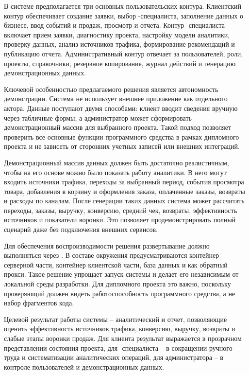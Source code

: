 В системе предполагается три основных пользовательских контура. Клиентский контур обеспечивает создание заявки, выбор -специалиста, заполнение данных о бизнесе, ввод событий и продаж, просмотр  и отчета. Контур -специалиста включает прием заявки, диагностику проекта, настройку модели аналитики, проверку данных, анализ источников трафика, формирование рекомендаций и публикацию отчета. Административный контур отвечает за пользователей, роли, проекты, справочники, резервное копирование, журнал действий и генерацию демонстрационных данных.

Ключевой особенностью предлагаемого решения является автономность демонстрации. Система не использует внешнее  приложение как отдельного актора. Данные поступают двумя способами: клиент вводит сведения вручную через табличные формы, а администратор может сформировать демонстрационный массив для выбранного проекта. Такой подход позволяет проверить все основные функции программного средства в рамках дипломного проекта и не зависеть от сторонних учетных записей или внешних интеграций.

Демонстрационный массив данных должен быть достаточно реалистичным, чтобы на его основе можно было показать работу аналитики. В него могут входить источники трафика, переходы за выбранный период, события просмотра товара, добавления в корзину и оформления заказа, оплаченные заказы, возвраты и расходы по каналам. После генерации таких данных система может рассчитать переходы, заказы, выручку, конверсию, средний чек, возвраты, эффективность источников и показатели воронки. Это позволяет продемонстрировать полный сценарий даже без подключения внешних сервисов.

Для обеспечения воспроизводимости решения развертывание должно выполняться через . В составе окружения предусматриваются контейнер серверной части, контейнер клиентской части, база данных  и  как обратный прокси. Такое решение упрощает запуск системы и делает его независимым от локальной среды разработки. Для дипломного проекта это важно, поскольку проверяющий должен видеть работоспособность программного средства, а не набор фрагментов кода.

Целевой результат работы системы -- аналитический  и отчет, позволяющие оценить эффективность источников трафика, конверсию, выручку, возвраты и слабые этапы воронки продаж. Для клиента результат выражается в прозрачном представлении состояния проекта, для -специалиста -- в сокращении ручного труда и систематизации аналитических операций, для администратора -- в контроле пользователей и демонстрационных данных.

